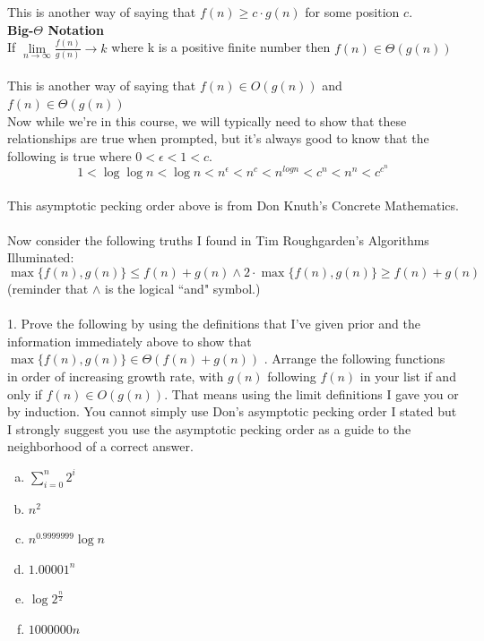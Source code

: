 \documentclass[12pt]{article}
\begin{document}
This is another way of saying that $f(n) \geq c \cdot g(n)$ for some position $c$.\\
\textbf{Big-$\Theta$ Notation}\\
If $\lim\limits_{n\to\infty}{\frac{f(n)}{g(n)}}\to k$ where k is a positive finite number then $f(n) \in \Theta(g(n))$\\\\
This is another way of saying that $f(n) \in O(g(n))$ and $f(n) \in \Theta(g(n))$\.\\
Now while we're in this course, we will typically need to show that these relationships are true when prompted, but it's always good to know that the following is true where \begin{math}0 < \epsilon < 1 < c\end{math}.\\
\[1 < \log{\log{n}} < \log{n} < n^{\epsilon} < n^c < n^{log{n}} < c^n < n^n < c^{c^{n}}\]\\
This asymptotic pecking order above is from Don Knuth's Concrete Mathematics.\\\\
Now consider the following truths I found in Tim Roughgarden's Algorithms Illuminated: \\
$$\max\{f(n),g(n)\} \leq f(n) + g(n) \land  2 \cdot \max\{f(n),g(n)\} \geq f(n) + g(n)$$
(reminder that $\land$ is the logical ``and" symbol.)\\\\
1. Prove the following  by using the definitions that I've given prior and the information immediately above to show that $\max\{f(n),g(n)\}\in\Theta(f(n) + g(n))$
\newpage
{}. Arrange the following functions in order of increasing growth rate, with $g(n)$ following $f(n)$ in your list if and only if $f(n) \in O(g(n))$. That means using the limit definitions I gave you or by induction. You cannot simply use Don's asymptotic pecking order I stated but I strongly suggest you use the asymptotic pecking order as a guide to the neighborhood of a correct answer.\\
\begin{enumerate}[a)]
\item $\sum\limits_{i = 0}^{n} 2^i$\\
\item $n^2$\\
\item $n^{0.9999999}\log{n}$\\
\item $1.00001^n$\\
\item $\log{2^{\frac{n}{2}}}$\\
\item $1000000n$\\
\end{enumerate}
\end{document}
